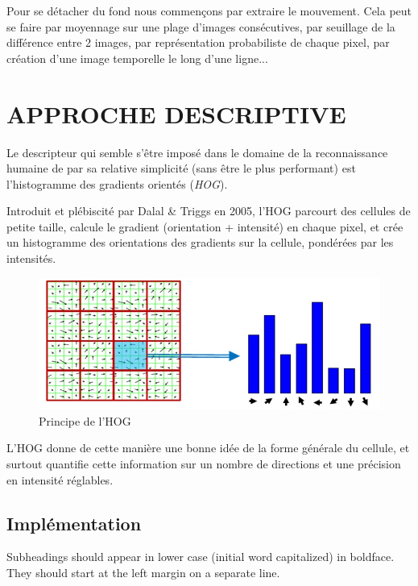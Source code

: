 \documentclass{article}
\begin{document}
	Pour se détacher du fond nous commençons par extraire le mouvement. Cela peut se faire par moyennage sur une plage d'images consécutives, par seuillage de la différence entre 2 images, par représentation probabiliste de chaque pixel, par création d'une image temporelle le long d'une ligne...
	
	

\section{APPROCHE DESCRIPTIVE}
\label{sec:desc}

	Le descripteur qui semble s'être imposé dans le domaine de la reconnaissance humaine de par sa relative simplicité (sans être le plus performant) est l'histogramme des gradients orientés (\emph{HOG}).
	
	Introduit et plébiscité par Dalal \& Triggs \cite{HOG} en 2005, l'HOG parcourt des cellules de petite taille, calcule le gradient (orientation + intensité) en chaque pixel, et crée un histogramme des orientations des gradients sur la cellule, pondérées par les intensités.
	
	\begin{figure}
		\begin{center}			
			\includegraphics[scale=0.3]{Img/HOGtheory}
		\end{center}
		\caption{Principe de l'HOG}
	\end{figure}

	L'HOG donne de cette manière une bonne idée de la forme générale du cellule, et surtout quantifie cette information sur un nombre de directions et une précision en intensité réglables.

\subsection{Implémentation}
\label{ssec:subhead}

Subheadings should appear in lower case (initial word capitalized) in
boldface.  They should start at the left margin on a separate line.
 
\end{document}
